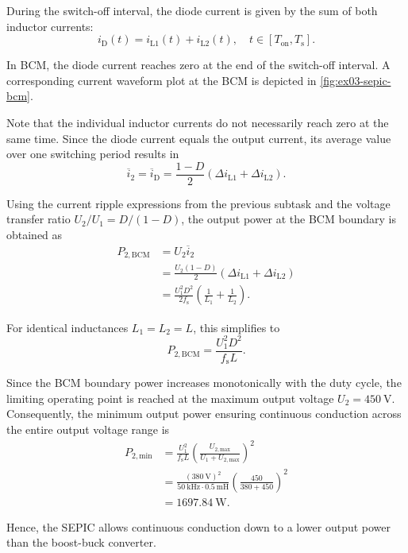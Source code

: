 \begin{solutionblock}
	During the switch-off interval, the diode current is given by the sum of both inductor currents:
	\begin{equation}
		i_\mathrm{D}(t) = i_\mathrm{L1}(t) + i_\mathrm{L2}(t),
		\quad t \in [T_\mathrm{on},T_\mathrm{s}].
	\end{equation}

	In BCM, the diode current reaches zero at the end of the switch-off interval. A corresponding current waveform plot at the BCM
	is depicted in \autoref{fig:ex03-sepic-bcm}.

	

	Note that the individual inductor currents do not necessarily reach zero at the same time. Since the diode current equals the output current, its average value over one switching period results in
	\begin{equation}
		\overline{i}_2 = \overline{i}_\mathrm{D}
		= \frac{1-D}{2}
		\left(\Delta i_\mathrm{L1}+\Delta i_\mathrm{L2}\right).
	\end{equation}

	Using the current ripple expressions from the previous subtask and the voltage transfer ratio $U_2/U_1=D/(1-D)$, the output power at the BCM boundary is obtained as
	\begin{equation}
		\begin{split}
			P_{2,\mathrm{BCM}}
			 & = U_2 \overline{i}_2                                \\
			 & = \frac{U_2(1-D)}{2}
			\left(\Delta i_\mathrm{L1}+\Delta i_\mathrm{L2}\right) \\
			 & = \frac{U_1^2D^2}{2f_\mathrm{s}}
			\left(\frac{1}{L_1}+\frac{1}{L_2}\right).
		\end{split}
	\end{equation}

	For identical inductances $L_1=L_2=L$, this simplifies to
	\begin{equation}
		P_{2,\mathrm{BCM}} = \frac{U_1^2D^2}{f_\mathrm{s}L}.
	\end{equation}

	Since the BCM boundary power increases monotonically with the duty cycle, the limiting operating point is reached	at the maximum output voltage $U_2=\SI{450}{\volt}$.
	Consequently, the minimum output power ensuring continuous conduction across the entire output voltage range is
	\begin{equation}
		\begin{split}
			P_{2,\mathrm{min}}
			 & = \frac{U_1^2}{f_\mathrm{s}L}
			\left(\frac{U_{2,\mathrm{max}}}
			      {U_1+U_{2,\mathrm{max}}}\right)^2                \\
			 & = \frac{(\SI{380}{\volt})^2}
			     {\SI{50}{\kilo\hertz}\cdot\SI{0.5}{\milli\henry}}
			\left(\frac{450}{380+450}\right)^2                     \\
			 & = \SI{1697.84}{\watt}.
		\end{split}
	\end{equation}

	Hence, the SEPIC allows continuous conduction down to a lower output power than the boost-buck converter.
\end{solutionblock}

